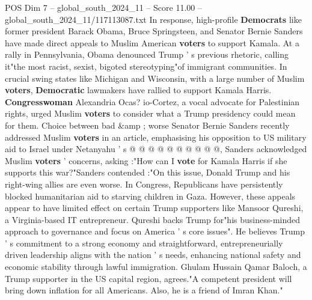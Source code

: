 \begin{textsample}{POS Dim 7 – global\_south\_2024\_11 – Score 11.00 – global\_south\_2024\_11/117113087.txt}
In response, high-profile \textbf{Democrats} like former president Barack Obama, Bruce Springsteen, and Senator Bernie Sanders have made direct appeals to Muslim American \textbf{voters} to support Kamala.
At a rally in Pennsylvania, Obama denounced Trump ' s previous rhetoric, calling it"the most racist, sexist, bigoted stereotyping"of immigrant communities.
In crucial swing states like Michigan and Wisconsin, with a large number of Muslim \textbf{voters}, \textbf{Democratic} lawmakers have rallied to support Kamala Harris. \textbf{Congresswoman} Alexandria Ocas? io-Cortez, a vocal advocate for Palestinian rights, urged Muslim \textbf{voters} to consider what a Trump presidency could mean for them.
Choice between bad \&amp ; worse Senator Bernie Sanders recently addressed Muslim \textbf{voters} in an article, emphasising his opposition to US military aid to Israel under Netanyahu ' s @ @ @ @ @ @ @ @ @ @, Sanders acknowledged Muslim \textbf{voters} ' concerns, asking :"How can I \textbf{vote} for Kamala Harris if she supports this war?"Sanders contended :"On this issue, Donald Trump and his right-wing allies are even worse.
In Congress, Republicans have persistently blocked humanitarian aid to starving children in Gaza.
However, these appeals appear to have limited effect on certain Trump supporters like Mansoor Qureshi, a Virginia-based IT entrepreneur.
Qureshi backs Trump for"his business-minded approach to governance and focus on America ' s core issues".
He believes Trump ' s commitment to a strong economy and straightforward, entrepreneurially driven leadership aligns with the nation ' s needs, enhancing national safety and economic stability through lawful immigration.
Ghulam Hussain Qamar Baloch, a Trump supporter in the US capital region, agrees."A competent president will bring down inflation for all Americans.
Also, he is a friend of Imran Khan."

\end{textsample}
